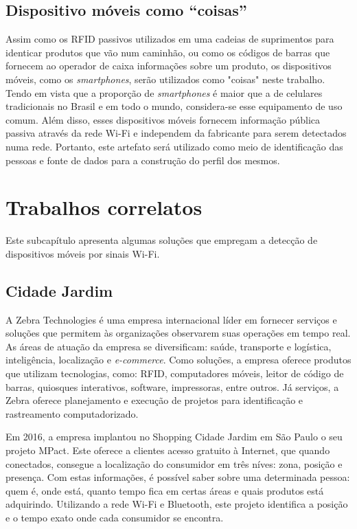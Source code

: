 \subsection{Dispositivo móveis como ``coisas''}
Assim como os RFID passivos utilizados em uma cadeias de suprimentos para identicar produtos que vão num caminhão, ou como os códigos de barras
que fornecem ao operador de caixa informações sobre um produto, os dispositivos móveis, como os \emph{smartphones}, serão utilizados
como "coisas" neste trabalho. Tendo em vista que a proporção de \emph{smartphones} é maior que a de celulares tradicionais no Brasil e em
todo o mundo, considera-se esse equipamento de uso comum. Além disso, esses dispositivos móveis fornecem informação pública passiva
através da rede Wi-Fi e independem da fabricante para serem detectados numa rede. Portanto, este artefato será utilizado como meio
de identificação das pessoas e fonte de dados para a construção do perfil dos mesmos.

\section{Trabalhos correlatos}
Este subcapítulo apresenta algumas soluções que
empregam a detecção de dispositivos móveis por sinais Wi-Fi.

\subsection{Cidade Jardim}
A Zebra Technologies é uma empresa internacional
líder em fornecer serviços e soluções que permitem às organizações observarem
suas operações em tempo real. As áreas de atuação da empresa se diversificam:
saúde, transporte e logística, inteligência, localização e \emph{e-commerce}.
Como soluções, a empresa oferece produtos que utilizam tecnologias, como: RFID,
computadores móveis, leitor de código de barras, quiosques interativos,
software, impressoras, entre outros. Já serviços, a Zebra oferece planejamento e
execução de projetos para identificação e rastreamento computadorizado.

Em 2016, a empresa implantou no Shopping Cidade Jardim em São Paulo o seu
projeto MPact. Este oferece a clientes acesso gratuito à Internet, que quando
conectados, consegue a localização do consumidor em três níves: zona, posição e
presença. Com estas informações, é possível saber sobre uma determinada pessoa:
quem é, onde está, quanto tempo fica em certas áreas e quais produtos está
adquirindo. Utilizando a rede Wi-Fi e Bluetooth, este projeto identifica a
posição e o tempo exato onde cada consumidor se encontra.


